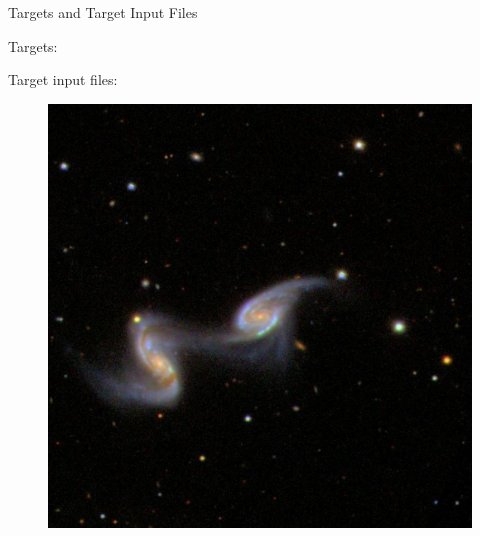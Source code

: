 \documentclass{beamer}
\begin{document}
\begin{frame}[fragile]{Targets and Target Input Files}
    \begin{minipage}{0.5\textwidth}
    Targets:
    {\tiny\linespread{0.5}
    }

    Target input files:
    {\tiny\linespread{0.5}
    }
    \end{minipage}%
    \begin{minipage}{0.5\textwidth}
        \begin{minipage}{0.5\linewidth}
        \begin{figure}[h]
            \centering
            \includegraphics[width=0.95\linewidth]{./images/targets/generic/uncalibrated.png}
        \end{figure}%
        \end{minipage}%
        \begin{minipage}{0.5\linewidth}
        \begin{figure}[h]
            \centering

\end{figure}
\end{minipage}
\end{minipage}
\end{frame}
\end{document}
